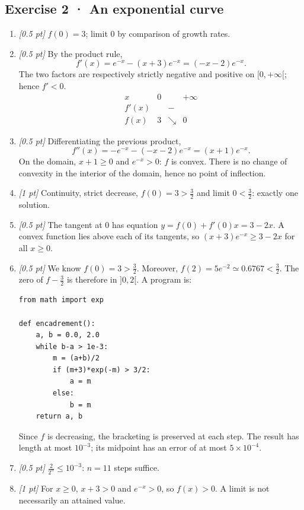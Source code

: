 \subsection*{Exercise 2 · An exponential curve}\begin{enumerate}

\item \textit{[0.5 pt]} $f(0)=3$; limit $0$ by comparison of growth rates.

\item \textit{[0.5 pt]} By the product rule,
\[f'(x)=e^{-x}-(x+3)e^{-x}=(-x-2)e^{-x}.\]
The two factors are respectively strictly negative and positive on $[0,+\infty[$; hence $f'<0$.
\[\begin{array}{c|ccc}x&0&&+\infty\\\hline f'(x)&&-&\\\hline f(x)&3&\searrow&0\end{array}\]

\item \textit{[0.5 pt]} Differentiating the previous product,
\[f''(x)=-e^{-x}-(-x-2)e^{-x}=(x+1)e^{-x}.\]
On the domain, $x+1\ge0$ and $e^{-x}>0$: $f$ is convex. There is no change of convexity in the interior of the domain, hence no point of inflection.

\item \textit{[1 pt]} Continuity, strict decrease, $f(0)=3>\frac{3}{2}$ and limit $0<\frac{3}{2}$: exactly one solution.

\item \textit{[0.5 pt]} The tangent at $0$ has equation $y=f(0)+f'(0)x=3-2x$. A convex function lies above each of its tangents, so $(x+3)e^{-x}\ge 3-2x$ for all $x\ge0$.


\item \textit{[0.5 pt]} We know $f(0)=3>\frac{3}{2}$. Moreover, $f(2)=5e^{-2}\simeq0.6767<\frac{3}{2}$. The zero of $f-\frac{3}{2}$ is therefore in $]0,2[$. A program is:
\begin{lstlisting}
from math import exp

def encadrement():
    a, b = 0.0, 2.0
    while b-a > 1e-3:
        m = (a+b)/2
        if (m+3)*exp(-m) > 3/2:
            a = m
        else:
            b = m
    return a, b
\end{lstlisting}
Since $f$ is decreasing, the bracketing is preserved at each step. The result has length at most $10^{-3}$; its midpoint has an error of at most $5\times10^{-4}$.

\item \textit{[0.5 pt]} $\frac{2}{2^n}\le10^{-3}$: $n=11$ steps suffice.

\item \textit{[1 pt]} For $x\ge0$, $x+3>0$ and $e^{-x}>0$, so $f(x)>0$. A limit is not necessarily an attained value.

\end{enumerate}

